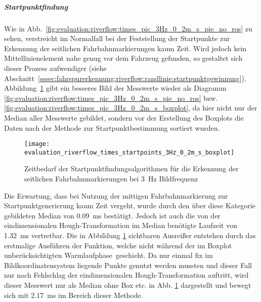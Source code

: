 \subparagraph{Startpunktfindung}
Wie in Abb.~\ref{fig:evaluation:riverflow:times_pic_3Hz_0_2m_s_pie_no_ros} zu sehen, verstreicht im Normalfall bei der Feststellung der Startpunkte zur Erkennung der seitlichen Fahrbahnmarkierungen kaum Zeit. Wird jedoch kein Mittellinienelement nahe genug vor dem Fahrzeug gefunden, so gestaltet sich dieser Prozess aufwendiger (siehe Abschnitt~\ref{sssec:fahrspurerkennung:riverflow:randlinie:startpunktgewinnung}). Abbildung~\ref{fig:evaluation:riverflow:times_startpoints_3Hz_0_2m_s_boxplot} gibt ein besseres Bild der Messwerte wieder als Diagramm \ref{fig:evaluation:riverflow:times_pic_3Hz_0_2m_s_pie_no_ros} bzw. \ref{fig:evaluation:riverflow:times_pic_3Hz_0_2m_s_boxplot}, da hier nicht nur der Median aller Messwerte gebildet, sondern vor der Erstellung des Boxplots die Daten nach der Methode zur Startpunktbestimmung sortiert wurden. 
\begin{figure}[htbp] %
\centering
\texttt{[image: evaluation\_riverflow\_times\_startpoints\_3Hz\_0\_2m\_s\_boxplot]}
\caption{Zeitbedarf der Startpunktfindungsalgorithmen für die Erkennung der seitlichen Fahrbahnmarkierungen bei \SI{3}{\hertz} Bildfrequenz}
\label{fig:evaluation:riverflow:times_startpoints_3Hz_0_2m_s_boxplot}
\end{figure}
Die Erwartung, dass bei Nutzung der mittigen Fahrbahnmarkierung zur Startpunktgenerierung kaum Zeit vergeht, wurde durch den über diese Kategorie gebildeten Median von \SI{0,09}{ms} bestätigt. Jedoch ist auch die von der eindimensionalen Hough-Transformation im Median benötigte Laufzeit von \SI{1,32}{ms} vertretbar. Die in Abbildung \ref{fig:evaluation:riverflow:times_startpoints_3Hz_0_2m_s_boxplot} sichtbaren Ausreißer entstehen durch das erstmalige Ausführen der Funktion, welche nicht während der im Boxplot unberücksichtigten \glqq Warmlaufphase\grqq\ geschieht. Da nur einmal fix im Bildkoordinatensystem liegende Punkte genutzt werden mussten und dieser Fall nur nach Fehlschlag der eindimensionalen Hough-Transformation auftritt, wird dieser Messwert nur als Median ohne Box etc. in Abb. \ref{fig:evaluation:riverflow:times_startpoints_3Hz_0_2m_s_boxplot} dargestellt und bewegt sich mit \SI{2,17}{ms} im Bereich dieser Methode.

